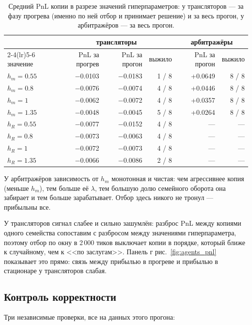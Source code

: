 \documentclass[11pt,a4paper]{article}
\begin{document}
\begin{table}[H]
\centering
\caption{Средний PnL копии в разрезе значений гиперпараметров: у
трансляторов --- за фазу прогрева (именно по ней отбор и принимает решение)
и за весь прогон, у арбитражёров --- за весь прогон.}
\small
\begin{tabular}{lrrrrr}
\toprule
& \multicolumn{3}{c}{трансляторы} & \multicolumn{2}{c}{арбитражёры} \\
\cmidrule(lr){2-4}\cmidrule(lr){5-6}
значение & PnL за прогрев & PnL за прогон & выжило & PnL за прогон & выжило \\
\midrule
\(h_m = 0.55\) & −0.0103 & −0.0183 & 1 / 8 & +0.0649 & 8 / 8 \\
\(h_m = 0.8\) & −0.0076 & −0.0074 & 4 / 8 & +0.0446 & 8 / 8 \\
\(h_m = 1\) & −0.0062 & −0.0072 & 4 / 8 & +0.0357 & 8 / 8 \\
\(h_m = 1.35\) & −0.0048 & −0.0045 & 5 / 8 & +0.0264 & 8 / 8 \\
\(h_R = 0.55\) & −0.0077 & −0.0152 & 4 / 8 & --- & --- \\
\(h_R = 0.8\) & −0.0073 & −0.0063 & 4 / 8 & --- & --- \\
\(h_R = 1\) & −0.0072 & −0.0073 & 4 / 8 & --- & --- \\
\(h_R = 1.35\) & −0.0066 & −0.0086 & 2 / 8 & --- & --- \\
\bottomrule
\end{tabular}
\end{table}

У арбитражёров зависимость от \(h_m\) монотонная и чистая: чем агрессивнее
копия (меньше \(h_m\)), тем больше её \(\lambda\), тем большую долю
семейного оборота она забирает и тем больше зарабатывает. Отбор здесь
никого не тронул --- прибыльны все.

У трансляторов сигнал слабее и сильно зашумлён: разброс PnL между копиями
одного семейства сопоставим с разбросом между значениями гиперпараметра,
поэтому отбор по окну в 2\,000 тиков выключает копии в порядке, который
ближе к случайному, чем к <<по заслугам>>. Панель г
рис.~\ref{fig:agents_pnl} показывает это прямо: связь между прибылью
в прогреве и прибылью в стационаре у трансляторов слабая.

\subsection{Контроль корректности}

Три независимые проверки, все на данных этого прогона:
\end{document}

